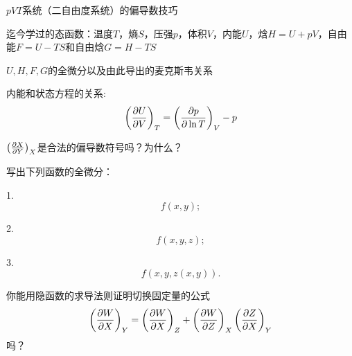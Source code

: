 \documentclass[CJK]{beamer}
\begin{document}
\begin{frame}
\bchL 
\bitem
\item{$pVT$系统（二自由度系统）的偏导数技巧}
\item{迄今学过的态函数：温度$T$，熵$S$，压强$p$，体积$V$，内能$U$，焓$H=U+pV$，自由能$F=U-TS$和自由焓$G=H-TS$}
\item{$U, H, F, G$的全微分以及由此导出的麦克斯韦关系}
\item{内能和状态方程的关系:
 $$\left(\frac{\partial U}{\partial V}\right)_{T} = \left(\frac{\partial p}{\partial \ln T}\right)_{V} - p $$}
\eitem
\echL
\end{frame}


\begin{frame}
\bchL


$\left(\frac{\partial X}{\partial Y}\right)_{X}$是合法的偏导数符号吗？为什么？

\echL
\end{frame}


\begin{frame}
\bchL

写出下列函数的全微分：
\bitem
\item[1.]{ $$f(x,y);$$}
\item[2.]{ $$f(x,y, z);$$}  
\item[3.]{$$f(x, y, z(x,y)). $$}
\eitem


\echL
\end{frame}



\begin{frame}
\bchL


你能用隐函数的求导法则证明切换固定量的公式
      $$ \left(\frac{\partial W}{\partial X}\right)_{Y} = \left(\frac{\partial W}{\partial X}\right)_{Z} + \left(\frac{\partial W}{\partial Z}\right)_{X} \left(\frac{\partial Z}{\partial X}\right)_{Y}$$
吗？
\echL
\end{frame}
\end{document}
